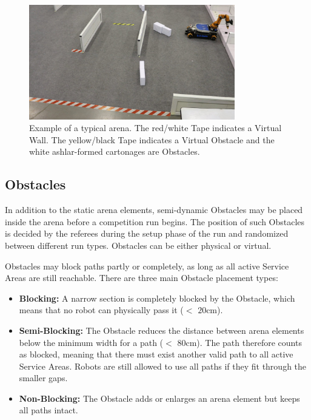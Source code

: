 \begin{figure} [h!]
\centering
\includegraphics[width= 0.8\textwidth ]{./images/general_rules/barrier_tapes_in_china15.jpg}
\caption{Example of a typical arena. The red/white Tape indicates a Virtual Wall. The yellow/black Tape indicates a Virtual Obstacle and the white ashlar-formed cartonages are Obstacles.}
\label{fig:walls_and_virt_walls}
\end{figure}

\subsection{Obstacles}
\label{subsec: Obstacles}

In addition to the static arena elements, semi-dynamic Obstacles may be placed inside the arena before a competition run begins. 
The position of such Obstacles is decided by the referees during the setup phase of the run and randomized between different run types. Obstacles can be either physical or virtual.

Obstacles may block paths partly or completely, as long as all active Service Areas are still reachable.
There are three main Obstacle placement types:

\begin{itemize}
\item \textbf{Blocking:} 
A narrow section is completely blocked by the Obstacle, which means that no robot can physically pass it ($<$ $20\si{\centi\meter}$).

\item \textbf{Semi-Blocking:} 
The Obstacle reduces the distance between arena elements below the minimum width for a path ($<$ $80\si{\centi\meter}$). The path therefore counts as blocked, meaning that there must exist another valid path to all active Service Areas. Robots are still allowed to use all paths if they fit through the smaller gaps.

\item \textbf{Non-Blocking:}
The Obstacle adds or enlarges an arena element but keeps all paths intact.
\end{itemize}


